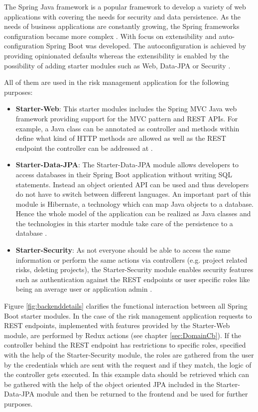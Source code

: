 The Spring Java framework is a popular framework to develop a variety of web applications with covering the needs for security and data persistence. As the needs of business applications are constantly growing, the Spring frameworks configuration became more complex \cite[p. 1]{prasadreddyBeginningSpringBoot2017}. With focus on extensibility and auto-configuration Spring Boot was developed. The autoconfiguration is achieved by providing opinionated defaults whereas the extensibility is enabled by the possibility of adding starter modules such as Web, Data-\ac{JPA}  or Security \cite[p. 21-22]{prasadreddyBeginningSpringBoot2017}. 

All of them are used in the risk management application for the following purposes:

\begin{itemize}
	\item \textbf{Starter-Web}: This starter modules includes the Spring \ac{MVC} Java web framework providing support for the \ac{MVC} pattern and \ac{REST} \ac{API}s. For example, a Java class can be annotated as controller and methods within define what kind of \ac{HTTP} methods are allowed as well as the \ac{REST} endpoint the controller can be addressed at \cite[p. 107-109]{prasadreddyBeginningSpringBoot2017}. 
	\item \textbf{Starter-Data-\ac{JPA}}: The Starter-Data-JPA module allows developers to access databases in their Spring Boot application without writing \acs{SQL} statements. Instead an object oriented \ac{API} can be used and thus developers do not have to switch between different languages. An important part of this module is Hibernate, a technology which can map Java objects to a database. Hence the whole model of the application can be realized as Java classes and the technologies in this starter module take care of the persistence to a database \cite[p. 83]{prasadreddyBeginningSpringBoot2017}. 
	\item \textbf{Starter-Security}: As not everyone should be able to access the same information or perform the same actions via controllers (e.g. project related risks, deleting projects), the Starter-Security module enables security features such as authentication against the \ac{REST} endpoints or user specific roles like being an average user or application admin \cite[p. 176-176]{prasadreddyBeginningSpringBoot2017}. 
\end{itemize}

Figure \ref{fig:backenddetails} clarifies the functional interaction between all Spring Boot starter modules. In the case of the risk management application requests to \ac{REST} endpoints, implemented with features provided by the Starter-Web module, are performed by Redux actions (see chapter \ref{sec:DomainCb}). If the controller behind the \ac{REST} endpoint has restrictions to specific roles, specified with the help of the Starter-Security module, the roles are gathered from the user by the credentials which are sent with the request and if they match, the logic of the controller gets executed. In this example data should be retrieved which can be gathered with the help of the object oriented JPA included in the Starter-Data-\ac{JPA} module and then be returned to the frontend and be used for further purposes. 

